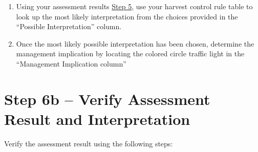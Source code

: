 \documentclass[]{book}
\begin{document}
\begin{enumerate}
\def\labelenumi{\alph{enumi})}
\item
  Using your assessment results \protect\hyperlink{Step5}{Step 5}, use
  your harvest control rule table to look up the most likely
  interpretation from the choices provided in the ``Possible
  Interpretation'' column.
\item
  Once the most likely possible interpretation has been chosen,
  determine the management implication by locating the colored circle
  traffic light in the ``Management Implication column''
\end{enumerate}

\section{Step 6b -- Verify Assessment Result and
Interpretation}\label{step-6b-verify-assessment-result-and-interpretation}

Verify the assessment result using the following steps:
\end{document}

